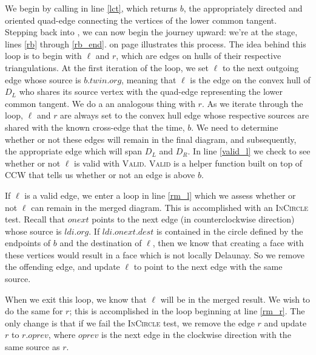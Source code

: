\documentclass[12pt,twoside]{reedthesis}
\begin{document}
        We begin by calling  in line \ref{lct}, which returns $b$, the appropriately directed and oriented quad-edge connecting the vertices of the lower common tangent. Stepping back into , we can now begin the journey upward: we're at the  stage, lines \ref{rb} through \ref{rb_end}.  on page \pageref{fig:del_knit_all} illustrates this process. The idea behind this loop is to begin with $\ell$ and $r$, which are edges on hulls of their respective triangulations. At the first iteration of the loop, we set $\ell$ to the next outgoing edge whose source is $b.twin.org$, meaning that $\ell$ is the edge on the convex hull of $D_{L}$ who shares its source vertex with the quad-edge representing the lower common tangent. We do a an analogous thing with $r$. As we iterate through the loop, $\ell$ and $r$ are always set to the convex hull edge whose respective sources are shared with the  known cross-edge that the time, $b$. We need to determine whether or not these edges will remain in the final diagram, and subsequently, the appropriate edge which will span $D_{L}$ and $D_{R}$. In line \ref{valid_l} we check to see whether or not $\ell$ is valid with \textsc{Valid}. \textsc{Valid} is a helper function built on top of \textsc{CCW} that tells us whether or not an edge is above $b$. 

        If $\ell$ is a valid edge, we enter a loop in line \ref{rm_l} which we assess whether or not $\ell$ can remain in the merged diagram. This is accomplished with an \textsc{InCircle} test. Recall that $onext$ points to the next edge (in counterclockwise direction) whose source is $ldi.org$. If $ldi.onext.dest$ is contained in the circle defined by the endpoints of $b$ and the destination of $\ell$, then we know that creating a face with these vertices would result in a face which is not locally Delaunay. So we remove the offending edge, and update $\ell$ to point to the next edge with the same source.\par

        When we exit this loop, we know that $\ell$ will be in the merged result. We wish to do the same for $r$; this is accomplished in the loop beginning at line \ref{rm_r}. The only change is that if we fail the \textsc{InCircle} test, we remove the edge $r$ and update $r$ to $r.oprev$, where $oprev$ is the next edge in the clockwise direction with the same source as $r$.\par
\end{document}
